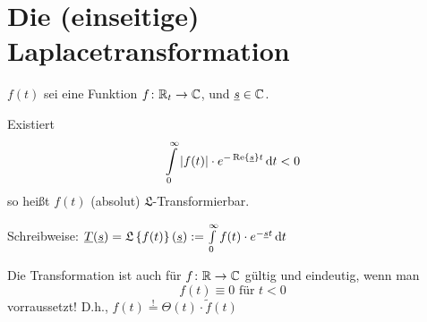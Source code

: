 
\chapter{Die (einseitige) Laplacetransformation}

\begin{definition}
  $f(t)$ sei eine Funktion $f\colon \mathbb{R}_t\to\mathbb{C}$, und
  $\underline{s}\in\mathbb{C}$.
  
  Existiert
  \[\int\limits_0^{\infty}|f(t)|\cdot e^{-\operatorname{Re}\left\{\underline{s}\right\}t}\,\mathrm{d} t < 0\]
  so heißt $f(t)$ (absolut) $\mathfrak L$-Transformierbar.
  
\end{definition}

  Schreibweise: $\underline{T}(\underline{s}) = \mathfrak{L}\left\{f(t)\right\}(\underline{s})
    := \int\limits_0^\infty f(t)\cdot e^{-\underline{s}t}\,\mathrm{d} t$
  
  Die Transformation ist auch für $f\colon \mathbb{R}\to\mathbb{C}$
  gültig und eindeutig,
  wenn man \[f(t)\equiv0 \text{ für } t<0\] vorraussetzt!
  D.h., $f(t)\stackrel{!}{=}\Theta(t)\cdot \tilde{f}(t)$
  
